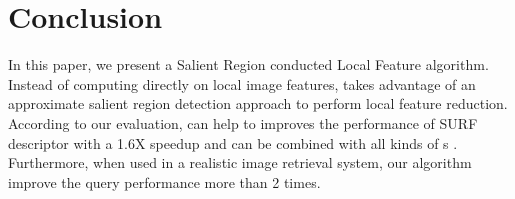 \section{Conclusion}
\label{sec:conclusion}

In this paper, we present a Salient Region conducted Local Feature algorithm. Instead of computing directly on local image features, {\sys} takes advantage of an approximate salient region detection approach to perform local feature reduction. According to our evaluation, {\sys} can help to improves the performance of SURF descriptor with a 1.6X speedup and can be combined with all kinds of {\lfea}s . Furthermore, when used in a realistic image retrieval system, our algorithm improve the query performance more than 2 times.
